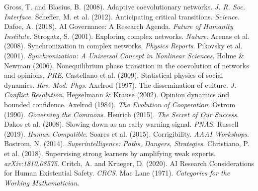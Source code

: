 \documentclass[12pt,a4paper]{article}
\begin{document}

\begin{thebibliography}{20}
 Gross, T. and Blasius, B. (2008). Adaptive coevolutionary networks. \emph{J. R. Soc. Interface.}
 Scheffer, M. et al. (2012). Anticipating critical transitions. \emph{Science.}
 Dafoe, A. (2018). AI Governance: A Research Agenda. \emph{Future of Humanity Institute.}
 Strogatz, S. (2001). Exploring complex networks. \emph{Nature}.
 Arenas et al. (2008). Synchronization in complex networks. \emph{Physics Reports}.
 Pikovsky et al. (2001). \emph{Synchronization: A Universal Concept in Nonlinear Sciences}.
 Holme \& Newman (2006). Nonequilibrium phase transition in the coevolution of networks and opinions. \emph{PRE}.
 Castellano et al. (2009). Statistical physics of social dynamics. \emph{Rev. Mod. Phys}.
 Axelrod (1997). The dissemination of culture. \emph{J. Conflict Resolution}.
 Hegselmann \& Krause (2002). Opinion dynamics and bounded confidence.
 Axelrod (1984). \emph{The Evolution of Cooperation}.
 Ostrom (1990). \emph{Governing the Commons}.
 Henrich (2015). \emph{The Secret of Our Success}.
 Dakos et al. (2008). Slowing down as an early warning signal. \emph{PNAS}.
 Russell (2019). \emph{Human Compatible}.
 Soares et al. (2015). Corrigibility. \emph{AAAI Workshops}.
 Bostrom, N. (2014). \emph{Superintelligence: Paths, Dangers, Strategies}.
 Christiano, P. et al. (2018). Supervising strong learners by amplifying weak experts. \emph{arXiv:1810.08575}.
 Critch, A. and Krueger, D. (2020). AI Research Considerations for Human Existential Safety. \emph{CRCS}.
 Mac Lane (1971). \emph{Categories for the Working Mathematician}.
\end{thebibliography}
\end{document}
